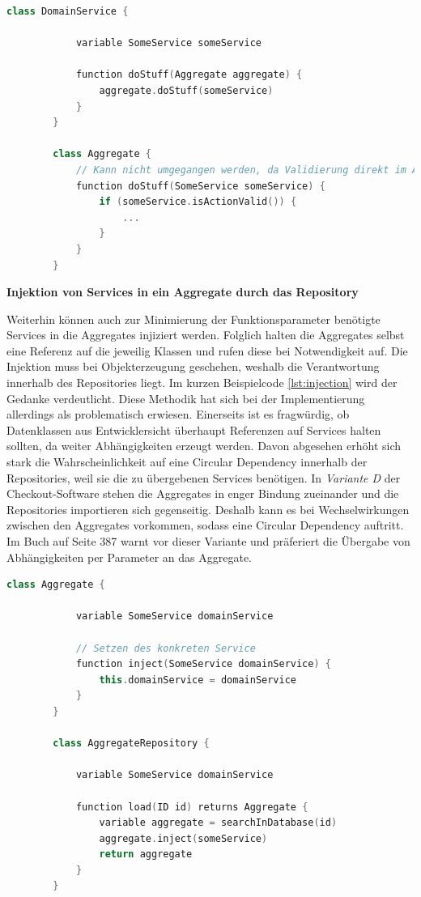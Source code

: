 \begin{minipage}{\linewidth} %
	\begin{lstlisting}[caption={Übergabe der Referenz an das Aggregate als Parameter}, label={lst:parameter}, language=Kotlin]
		class DomainService {
			
			variable SomeService someService
			
			function doStuff(Aggregate aggregate) {
				aggregate.doStuff(someService)
			}
		}
		
		class Aggregate {
			// Kann nicht umgegangen werden, da Validierung direkt im Aggregate geschieht
			function doStuff(SomeService someService) {
				if (someService.isActionValid()) {
					...
				}
			}
		}
	\end{lstlisting}
\end{minipage}

\textbf{Injektion von Services in ein Aggregate durch das Repository}

Weiterhin können auch zur Minimierung der Funktionsparameter benötigte Services in die Aggregates injiziert werden. Folglich halten die Aggregates selbst eine Referenz auf die jeweilig Klassen und rufen diese bei Notwendigkeit auf. Die Injektion muss bei Objekterzeugung geschehen, weshalb die Verantwortung innerhalb des Repositories liegt. Im kurzen Beispielcode \ref{lst:injection} wird der Gedanke verdeutlicht. Diese Methodik hat sich bei der Implementierung allerdings als problematisch erwiesen. Einerseits ist es fragwürdig, ob Datenklassen aus Entwicklersicht überhaupt Referenzen auf Services halten sollten, da weiter Abhängigkeiten erzeugt werden. Davon abgesehen erhöht sich stark die Wahrscheinlichkeit auf eine Circular Dependency innerhalb der Repositories, weil sie die zu übergebenen Services benötigen. In \emph{Variante D} der Checkout-Software stehen die Aggregates in enger Bindung zueinander und die Repositories importieren sich gegenseitig. Deshalb kann es bei Wechselwirkungen zwischen den Aggregates vorkommen, sodass eine Circular Dependency auftritt. Im Buch  auf Seite 387 warnt \citeauthor{Vernon.2015} vor dieser Variante und präferiert die Übergabe von Abhängigkeiten per Parameter an das Aggregate.

\begin{minipage}{\linewidth} %
	\begin{lstlisting}[caption={Injektion eines Services in ein Aggregate durch das Repository}, label={lst:injection}, language=Kotlin]
		class Aggregate {
			
			variable SomeService domainService
			
			// Setzen des konkreten Service
			function inject(SomeService domainService) {
				this.domainService = domainService
			}
		}
		
		class AggregateRepository {
			
			variable SomeService domainService
			
			function load(ID id) returns Aggregate {
				variable aggregate = searchInDatabase(id)
				aggregate.inject(someService)
				return aggregate
			}
		}
	\end{lstlisting}
\end{minipage}


